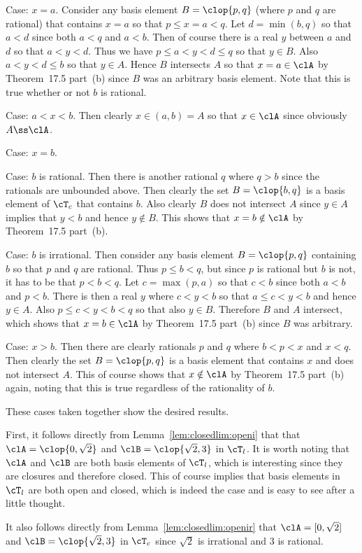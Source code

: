 {{    Case: $x = a$.
    Consider any basis element $B = \clop{p,q}$ (where $p$ and $q$ are rational) that contains $x = a$ so that $p \leq x = a < q$.
    Let $d = \min(b,q)$ so that $a < d$ since both $a < q$ and $a < b$.
    Then of course there is a real $y$ between $a$ and $d$ so that $a < y < d$.
    Thus we have $p \leq a < y < d \leq q$ so that $y \in B$.
    Also $a < y < d \leq b$ so that $y \in A$.
    Hence $B$ intersects $A$ so that $x = a \in \clA$ by Theorem~17.5 part~(b) since $B$ was an arbitrary basis element.
    Note that this is true whether or not $b$ is rational.

    Case: $a < x < b$.
    Then clearly $x \in (a,b) = A$ so that $x \in \clA$ since obviously $A \ss \clA$.

    Case: $x = b$.
    \begin{indpar}
      Case: $b$ is rational.
      Then there is another rational $q$ where $q > b$ since the rationals are unbounded above.
      Then clearly the set $B = \clop{b, q}$ is a basis element of $\cT_c$ that contains $b$.
      Also clearly $B$ does not intersect $A$ since $y \in A$ implies that $y < b$ and hence $y \notin B$.
      This shows that $x = b \notin \clA$ by Theorem~17.5 part~(b).

      Case: $b$ is irrational.
      Then consider any basis element $B = \clop{p,q}$ containing $b$ so that $p$ and $q$ are rational.
      Thus $p \leq b < q$, but since $p$ is rational but $b$ is not, it has to be that $p < b < q$.
      Let $c = \max(p,a)$ so that $c < b$ since both $a < b$ and $p < b$.
      There is then a real $y$ where $c < y < b$ so that $a \leq c < y < b$ and hence $y \in A$.
      Also $p \leq c < y < b < q$ so that also $y \in B$.
      Therefore $B$ and $A$ intersect, which shows that $x = b \in \clA$ by Theorem~17.5 part~(b) since $B$ was arbitrary.
    \end{indpar}

    Case: $x > b$.
    Then there are clearly rationals $p$ and $q$ where $b < p < x$ and $x < q$.
    Then clearly the set $B = \clop{p,q}$ is a basis element that contains $x$ and does not intersect $A$.
    This of course shows that $x \notin \clA$ by Theorem~17.5 part~(b) again, noting that this is true regardless of the rationality of $b$.

    These cases taken together show the desired results.
  }

  \mainprob
  
  First, it follows directly from Lemma~\ref{lem:closedlim:openi} that that $\clA = \clop{0, \sqrt{2}}$ and $\clB = \clop{\sqrt{2},3}$ in $\cT_l$.
  It is worth noting that $\clA$ and $\clB$ are both basis elements of $\cT_l$, which is interesting since they are closures and therefore closed.
  This of course implies that basis elements in $\cT_l$ are both open and closed, which is indeed the case and is easy to see after a little thought.
  
  It also follows directly from Lemma~\ref{lem:closedlim:openir} that $\clA = [0, \sqrt{2}]$ and $\clB = \clop{\sqrt{2}, 3}$ in $\cT_c$ since $\sqrt{2}$ is irrational and $3$ is rational.
}

